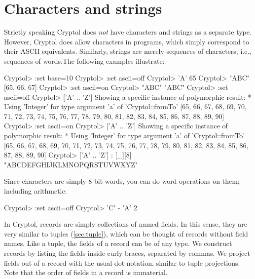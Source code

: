 \section{Characters and strings}
\label{sec:charstring}

Strictly speaking Cryptol does {\em not} have characters and strings
as a separate type. However, Cryptol does allow characters in
programs, which simply correspond to their ASCII
equivalents. Similarly, strings are merely sequences of characters,
i.e., sequences of words.\indTheStringType\indTheCharType The
following examples illustrate:
\restartrepl
\begin{replPrompt}
  Cryptol> :set base=10
  Cryptol> :set ascii=off
  Cryptol> 'A'
  65
  Cryptol> "ABC"
  [65, 66, 67]
  Cryptol> :set ascii=on
  Cryptol> "ABC"
  "ABC"
  Cryptol> :set ascii=off
  Cryptol> ['A' .. 'Z']
  Showing a specific instance of polymorphic result:
    * Using 'Integer' for type argument 'a' of 'Cryptol::fromTo'
  [65, 66, 67, 68, 69, 70, 71, 72, 73, 74, 75, 76, 77, 78, 79, 80,
   81, 82, 83, 84, 85, 86, 87, 88, 89, 90]
  Cryptol> :set ascii=on
  Cryptol> ['A' .. 'Z']
  Showing a specific instance of polymorphic result:
    * Using 'Integer' for type argument 'a' of 'Cryptol::fromTo'
  [65, 66, 67, 68, 69, 70, 71, 72, 73, 74, 75, 76, 77, 78, 79, 80,
   81, 82, 83, 84, 85, 86, 87, 88, 89, 90]
  Cryptol> ['A' .. 'Z'] : [_][8]
  "ABCDEFGHIJKLMNOPQRSTUVWXYZ"
\end{replPrompt}

\noindent Since characters are simply 8-bit words, you can do word
operations on them; including arithmetic:
\begin{replPrompt}
  Cryptol> :set ascii=off
  Cryptol> 'C' - 'A'
  2
\end{replPrompt}


In Cryptol, records are simply collections of named fields. In this
sense, they are very similar to tuples (\autoref{sec:tuple}), which
can be thought of records without field names. Like a tuple, the
fields of a record can be of any type. We construct records by listing
the fields inside curly braces, separated by commas. We project fields
out of a record with the usual dot-notation, similar to tuple
projections. Note that the order of fields in a record is
immaterial.\indTheRecordType\indTheTupleType

